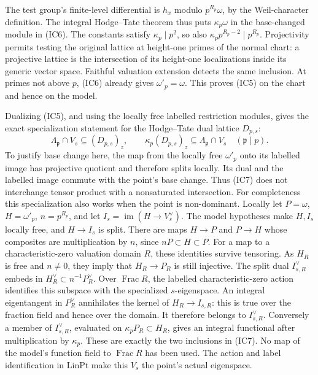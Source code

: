 The test group's finite-level differential is \(h_x\)
modulo \(p^{R_p}\omega\), by the Weil-character
definition. The integral Hodge--Tate theorem thus
puts \(\kappa_p\omega\) in the base-changed module
in (IC6).
The constants satisfy
\(\kappa_p\mid p^2\), so also
\(\kappa_pp^{R_p-2}\mid p^{R_p}\).
Projectivity permits testing the original lattice
at height-one primes of the normal chart:
a projective lattice is the intersection of its
height-one localizations inside its generic vector
space. Faithful valuation extension detects the
same inclusion. At primes not above \(p\),
(IC6) already gives \(\omega'_p=\omega\).
This proves (IC5) on the chart and hence on the model.

Dualizing (IC5), and using the locally free labelled
restriction modules, gives the exact specialization
statement for the Hodge--Tate dual lattice \(D_{p,s}\):
\[
 \Lambda_{\mathfrak p}\cap V_s
       \subseteq (D_{p,s})_z,\qquad
 \kappa_p(D_{p,s})_z
       \subseteq\Lambda_{\mathfrak p}\cap V_s
                                      \quad(\mathfrak p\mid p).
 \tag{IC7}
\]
To justify base change here, the map from the locally
free \(\omega'_p\) onto its labelled image has
projective quotient and therefore splits locally.
Its dual and the labelled image commute with the
point's base change. Thus (IC7) does not interchange
tensor product with a nonsaturated intersection.
For completeness this specialization also works when
the point is non-dominant. Locally let \(P=\omega\),
\(H=\omega'_p\), \(n=p^{R_p}\), and let
\(I_s=\operatorname{im}(H\to V_s^\vee)\).
The model hypotheses make \(H,I_s\) locally free,
and \(H\to I_s\) is split. There are maps
\(H\to P\) and \(P\to H\) whose composites are
multiplication by \(n\), since \(nP\subset H\subset P\).
For a map to a characteristic-zero valuation domain
\(R\), these identities survive tensoring.
As \(H_R\) is free and \(n\ne0\), they imply that
\(H_R\to P_R\) is still injective.
The split dual \(I_{s,R}^\vee\) embeds in
\(H_R^\vee\subset n^{-1}P_R^\vee\).
Over \(\operatorname{Frac}R\), the labelled
characteristic-zero action identifies this subspace
with the specialized \(s\)-eigenspace.
An integral eigentangent in \(P_R^\vee\) annihilates
the kernel of \(H_R\to I_{s,R}\): this is true over
the fraction field and hence over the domain.
It therefore belongs to \(I_{s,R}^\vee\).
Conversely a member of \(I_{s,R}^\vee\), evaluated
on \(\kappa_pP_R\subset H_R\), gives an integral
functional after multiplication by \(\kappa_p\).
These are exactly the two inclusions in (IC7).
No map of the model's function field to
\(\operatorname{Frac}R\) has been used.
The action and label identification in
\(\mathrm{LinPt}\) make this \(V_s\) the point's
actual eigenspace.

